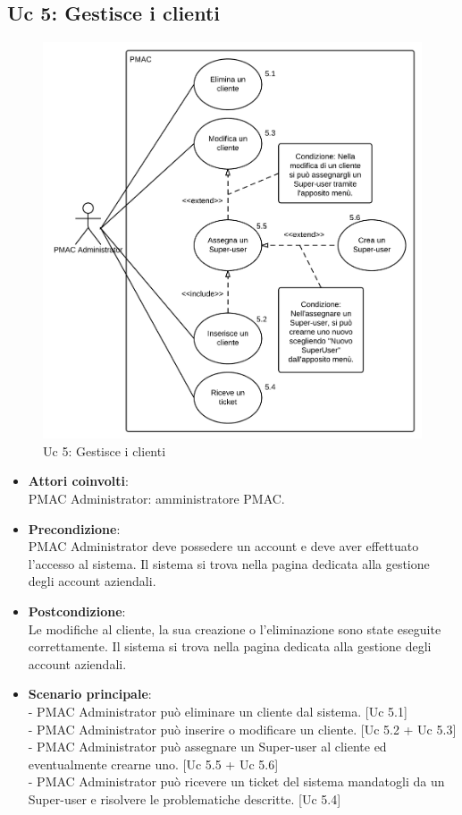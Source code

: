 \documentclass[10pt,a4paper]{article}
\begin{document}
\subsection{Uc 5: Gestisce i clienti}
\begin{figure}[ht]
\centering
\caption{Uc 5: Gestisce i clienti}
\includegraphics[scale=0.9]{UseCase/Uc5} %
\end{figure}

\begin{itemize}
\item \textbf{Attori coinvolti}:\\
PMAC Administrator: amministratore PMAC.

\item \textbf{Precondizione}:\\
PMAC Administrator deve possedere un account e deve aver effettuato l'accesso al sistema. Il sistema si trova nella pagina dedicata alla gestione degli account aziendali.

\item \textbf{Postcondizione}:\\
Le modifiche al cliente, la sua creazione o l'eliminazione sono state eseguite correttamente. Il sistema si trova nella pagina dedicata alla gestione degli account aziendali.

\item \textbf{Scenario principale}:\\
- PMAC Administrator può eliminare un cliente dal sistema. [Uc 5.1]\\
- PMAC Administrator può inserire o modificare un cliente. [Uc 5.2 + Uc 5.3]\\
- PMAC Administrator può assegnare un Super-user al cliente ed eventualmente crearne uno. [Uc 5.5 + Uc 5.6]\\
- PMAC Administrator può ricevere un ticket del sistema mandatogli da un Super-user e risolvere le problematiche descritte. [Uc 5.4]
\end{itemize}
\end{document}
